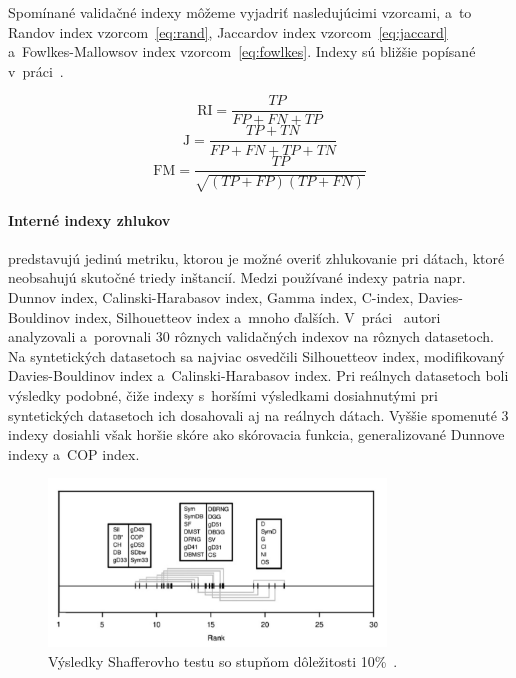 \documentclass[a4paper,twoside,slovak,12pt,appendix]{article}
\begin{document}
Spomínané validačné indexy môžeme vyjadriť nasledujúcimi vzorcami, a~to Randov
index vzorcom~\ref{eq:rand}, Jaccardov index vzorcom~\ref{eq:jaccard}
a~Fowlkes-Mallowsov index vzorcom~\ref{eq:fowlkes}. Indexy sú bližšie popísané
v~práci~\cite{Bilgic2018}.

\begin{equation}
	\label{eq:rand}
  \text{RI} = \frac{TP}{FP + FN + TP}
\end{equation}
\begin{equation}
	\label{eq:jaccard}
  \text{J} = \frac{TP + TN}{FP + FN + TP + TN}
\end{equation}
\begin{equation}
	\label{eq:fowlkes}
  \text{FM} = \frac{TP}{\sqrt{(TP + FP)(TP + FN)}}
\end{equation}

\paragraph{Interné indexy zhlukov} predstavujú jedinú metriku, ktorou je možné
overiť zhlukovanie pri dátach, ktoré neobsahujú skutočné triedy inštancií. Medzi
používané indexy patria napr. Dunnov index, Calinski-Harabasov index, Gamma
index, C-index, Davies-Bouldinov index, Silhouetteov index a~mnoho ďalších.
V~práci~\cite{Arbelaitz2013} autori analyzovali a~porovnali 30 rôznych
validačných indexov na rôznych datasetoch. Na syntetických datasetoch sa najviac
osvedčili Silhouetteov index, modifikovaný Davies-Bouldinov index
a~Calinski-Harabasov index. Pri reálnych datasetoch boli výsledky podobné, čiže
indexy s~horšími výsledkami dosiahnutými pri syntetických datasetoch ich
dosahovali aj na reálnych dátach. Vyššie spomenuté 3 indexy dosiahli však horšie
skóre ako skórovacia funkcia, generalizované Dunnove indexy a~COP index.

\begin{figure}[htbp]
  \centering
  \includegraphics[width=0.8\textwidth]{shaffer_test.png}
  \caption{Výsledky Shafferovho testu so stupňom dôležitosti 10\%~\cite{Arbelaitz2013}.}
  \label{fig:shaffer-test}
\end{figure}
\end{document}
